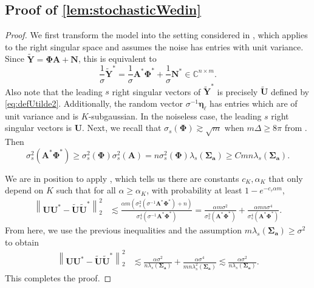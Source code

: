 \documentclass[11pt]{article}
\theoremstyle{definition}
\numberwithin{theorem}{section}
\numberwithin{equation}{section}
\def\C{\mathbb{C}}
\renewcommand{\tilde}{\widetilde}
\newcommand{\bfa}{{\boldsymbol a}}
\newcommand{\bfA}{{\boldsymbol A}}
\newcommand{\bfN}{{\boldsymbol N}}
\newcommand{\bfU}{{\boldsymbol U}}
\newcommand{\bfY}{{\boldsymbol Y}}
\newcommand{\bfeta}{{\boldsymbol \eta}}
\newcommand{\bfPhi}{{\boldsymbol \Phi}}
\newcommand{\bfSigma}{{\boldsymbol \Sigma}}
\numberwithin{equation}{section}
\begin{document}
\subsection{Proof of \cref{lem:stochasticWedin}}
\label{proof:stochasticWedin}

\begin{proof}
    We first transform the model into the setting considered in \cite[Theorem 6]{dirksen2025subspace}, which applies to the right singular space and assumes the noise has entries with unit variance. Since $\tilde \bfY=\bfPhi \bfA+\bfN$, this is equivalent to 
    $$
    \frac 1 {\sigma} \tilde \bfY^*  = \frac 1 {\sigma} \bfA^* \bfPhi^* + \frac 1 {\sigma} \bfN^* \in \C^{n\times m}.
    $$
    Also note that the leading $s$ right singular vectors of $\tilde\bfY^*$ is precisely $\tilde \bfU$ defined by \eqref{eq:defUtilde2}. Additionally, the random vector $\sigma^{-1} \bfeta_\ell$ has entries which are of unit variance and is $K$-subgaussian. In the noiseless case, the leading $s$ right singular vectors is $\bfU$. Next, we recall that $\sigma_s(\bfPhi)\gtrsim \sqrt m$ when $m\Delta \geq 8\pi$ from \cite{aubel2019vandermonde}. Then
    $$
    \sigma_s^2\left( \bfA^* \bfPhi^* \right) 
    \geq \sigma_s^2(\bfPhi) \sigma_s^2\left( \bfA \right) 
    = n \sigma_s^2(\bfPhi) \lambda_s(\bfSigma_{\bfa})
    \geq C m n \lambda_s(\bfSigma_{\bfa}).
    $$
    
    We are in position to apply \cite[Theorem 6]{dirksen2025subspace}, which tells us there are constants $c_K,\alpha_K$ that only depend on $K$ such that for all $\alpha \geq \alpha_K$, with probability at least $1-e^{-c_\tau\alpha m}$,
    \begin{align*}
    \left\|\bfU\bfU^*- \tilde \bfU \tilde \bfU^* \right\|_2^2
    &\lesssim \frac{ \alpha m (\sigma_s^2\left( \sigma^{-1} \bfA^* \bfPhi^* \right) + n)} {\sigma_s^4\left( \sigma^{-1} \bfA^* \bfPhi^* \right)}
    = \frac{\alpha m \sigma^2}{\sigma_s^2\left( \bfA^* \bfPhi^* \right)} + \frac{\alpha m n \sigma^4}{\sigma_s^4\left( \bfA^* \bfPhi^* \right)}.
    \end{align*}
    From here, we use the previous inequalities and the assumption $m\lambda_s(\bfSigma_{\bfa})\geq \sigma^2$ to obtain
    \begin{align*}
    \left\|\bfU\bfU^*- \tilde \bfU \tilde \bfU^*\right\|_2^2
    &\lesssim \frac {\alpha\sigma^2 } {n\lambda_s(\bfSigma_{\bfa})} + \frac {\alpha\sigma^4} {m n \lambda_s^2(\bfSigma_{\bfa})}
    \lesssim \frac {\alpha\sigma^2 } {n\lambda_s(\bfSigma_{\bfa})}.
    \end{align*}
    This completes the proof. 
\end{proof}
\end{document}
